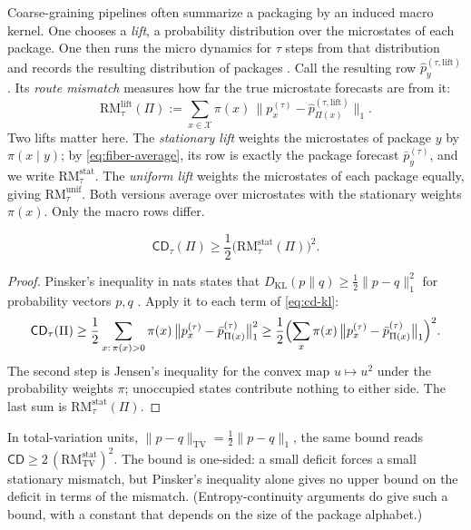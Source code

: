 Coarse-graining pipelines often summarize a packaging by an induced macro kernel. One chooses a \emph{lift}, a probability distribution over the microstates of each package. One then runs the micro dynamics for $\tau$ steps from that distribution and records the resulting distribution of packages \citep{tsiokos2026pica}. Call the resulting row $\widehat p_y^{(\tau,\mathrm{lift})}$. Its \emph{route mismatch} measures how far the true microstate forecasts are from it:
\begin{equation}
\mathrm{RM}_\tau^{\mathrm{lift}}(\Pi)
:=
\sum_{x \in \mathcal{X}}
\pi(x)\,
\bigl\|
p_x^{(\tau)} - \widehat p_{\Pi(x)}^{(\tau,\mathrm{lift})}
\bigr\|_1 .
\label{eq:route-mismatch}
\end{equation}
Two lifts matter here. The \emph{stationary lift} weights the microstates of package $y$ by $\pi(x\mid y)$; by \eqref{eq:fiber-average}, its row is exactly the package forecast $\bar p_y^{(\tau)}$, and we write $\mathrm{RM}_\tau^{\mathrm{stat}}$. The \emph{uniform lift} weights the microstates of each package equally, giving $\mathrm{RM}_\tau^{\mathrm{unif}}$. Both versions average over microstates with the stationary weights $\pi(x)$. Only the macro rows differ.

\begin{proposition}\label{prop:rm-lower-bound}
\begin{equation}
\mathsf{CD}_\tau(\Pi)
\ge
\frac{1}{2}\bigl(\mathrm{RM}_\tau^{\mathrm{stat}}(\Pi)\bigr)^2.
\label{eq:rm-lower-bound}
\end{equation}
\end{proposition}

\begin{proof}
Pinsker's inequality in nats states that $D_{\mathrm{KL}}(p\|q)\ge\tfrac12\|p-q\|_1^2$ for probability vectors $p,q$ \citep{cover2006elementsofinformationtheory}. Apply it to each term of \eqref{eq:cd-kl}:
\[
\mathsf{CD}_\tau(\Pi)
\ge
\frac12\sum_{x:\,\pi(x)>0}\pi(x)\,\bigl\|p_x^{(\tau)}-\bar p_{\Pi(x)}^{(\tau)}\bigr\|_1^2
\ge
\frac12\Bigl(\sum_{x}\pi(x)\,\bigl\|p_x^{(\tau)}-\bar p_{\Pi(x)}^{(\tau)}\bigr\|_1\Bigr)^2 .
\]
The second step is Jensen's inequality for the convex map $u\mapsto u^2$ under the probability weights $\pi$; unoccupied states contribute nothing to either side. The last sum is $\mathrm{RM}_\tau^{\mathrm{stat}}(\Pi)$.
\end{proof}

In total-variation units, $\|p-q\|_{\mathrm{TV}}=\tfrac12\|p-q\|_1$, the same bound reads $\mathsf{CD}\ge 2\,(\mathrm{RM}^{\mathrm{stat}}_{\mathrm{TV}})^2$. The bound is one-sided: a small deficit forces a small stationary mismatch, but Pinsker's inequality alone gives no upper bound on the deficit in terms of the mismatch. (Entropy-continuity arguments do give such a bound, with a constant that depends on the size of the package alphabet.)

